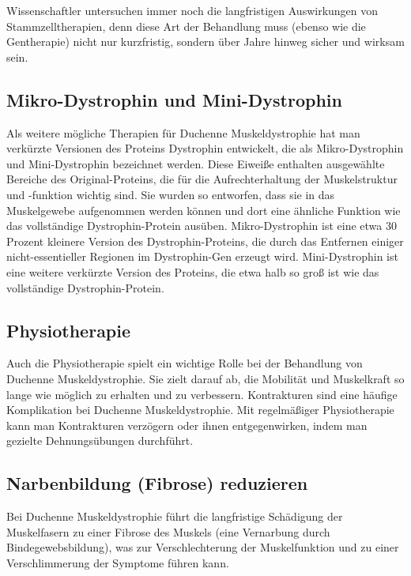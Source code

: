 \documentclass[fontsize=14pt,a4paper,headinclude,DIV=calc,automark]{scrbook}
\begin{document}
Wissenschaftler untersuchen immer noch die langfristigen Auswirkungen von Stammzelltherapien, denn diese Art der Behandlung muss (ebenso wie die Gentherapie) nicht nur kurzfristig, sondern über Jahre hinweg sicher und wirksam sein.

\subsection{Mikro-Dystrophin und Mini-Dystrophin}

Als weitere mögliche Therapien für Duchenne Muskeldystrophie hat man verkürzte Versionen des Proteins Dystrophin entwickelt, die als Mikro-Dys\-tro\-phin und Mini-Dys\-tro\-phin bezeichnet werden. Diese Eiweiße enthalten ausgewählte Bereiche des Original-Proteins, die für die Aufrechterhaltung der Muskelstruktur und -funktion wichtig sind. Sie wurden so entworfen, dass sie in das Muskelgewebe aufgenommen werden können und dort eine ähnliche Funktion wie das vollständige Dystrophin-Protein ausüben. Mikro-Dystrophin ist eine etwa 30 Prozent kleinere Version des Dys\-tro\-phin-Pro\-teins, die durch das Entfernen einiger nicht-essen\-tiel\-ler Regionen im Dys\-tro\-phin-Gen erzeugt wird. Mini-Dystrophin ist eine weitere verkürzte Version des Proteins, die etwa halb so groß ist wie das vollständige Dys\-tro\-phin-Pro\-tein.

\subsection{Physiotherapie}

Auch die Physiotherapie spielt ein wichtige Rolle bei der Behandlung von Duchenne Muskeldystrophie. Sie zielt darauf ab, die Mobilität und Muskelkraft so lange wie möglich zu erhalten und zu verbessern. Kontrakturen sind eine häufige Komplikation bei Duchenne Muskeldystrophie. Mit regelmäßiger Physiotherapie kann man Kontrakturen verzögern oder ihnen entgegenwirken, indem man gezielte Dehnungsübungen durchführt.

\subsection{Narbenbildung (Fibrose) reduzieren}

Bei Duchenne Muskeldystrophie führt die langfristige Schädigung der Muskelfasern zu einer Fibrose des Muskels (eine Vernarbung durch Bindegewebsbildung), was zur Verschlechterung der Muskelfunktion und zu einer Verschlimmerung der Symptome führen kann.
\end{document}
